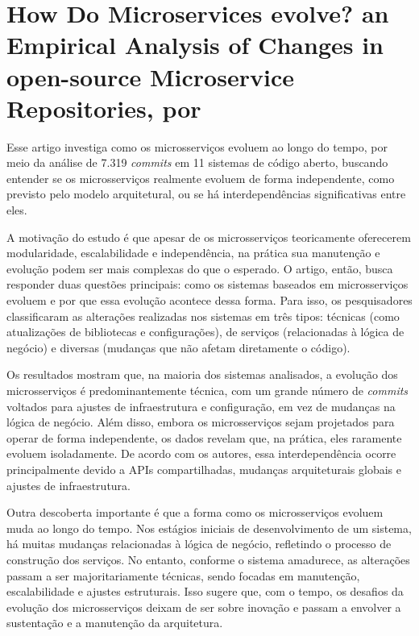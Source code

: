 \section{How Do Microservices evolve? an Empirical Analysis of Changes in open-source Microservice Repositories, por \texorpdfstring{}{Assunção et al. (2023)}}

Esse artigo investiga como os microsserviços evoluem ao longo do tempo, por meio da análise de 7.319 \emph{commits} em 11 sistemas de código aberto, buscando entender se os microsserviços realmente evoluem de forma independente, como previsto pelo modelo arquitetural, ou se há interdependências significativas entre eles.

A motivação do estudo é que apesar de os microsserviços teoricamente oferecerem modularidade, escalabilidade e independência, na prática sua manutenção e evolução podem ser mais complexas do que o esperado. O artigo, então, busca responder duas questões principais: como os sistemas baseados em microsserviços evoluem e por que essa evolução acontece dessa forma. Para isso, os pesquisadores classificaram as alterações realizadas nos sistemas em três tipos: técnicas (como atualizações de bibliotecas e configurações), de serviços (relacionadas à lógica de negócio) e diversas (mudanças que não afetam diretamente o código).

Os resultados mostram que, na maioria dos sistemas analisados, a evolução dos microsserviços é predominantemente técnica, com um grande número de \emph{commits} voltados para ajustes de infraestrutura e configuração, em vez de mudanças na lógica de negócio. Além disso, embora os microsserviços sejam projetados para operar de forma independente, os dados revelam que, na prática, eles raramente evoluem isoladamente. De acordo com os autores, essa interdependência ocorre principalmente devido a APIs compartilhadas, mudanças arquiteturais globais e ajustes de infraestrutura.

Outra descoberta importante é que a forma como os microsserviços evoluem muda ao longo do tempo. Nos estágios iniciais de desenvolvimento de um sistema, há muitas mudanças relacionadas à lógica de negócio, refletindo o processo de construção dos serviços. No entanto, conforme o sistema amadurece, as alterações passam a ser majoritariamente técnicas, sendo focadas em manutenção, escalabilidade e ajustes estruturais. Isso sugere que, com o tempo, os desafios da evolução dos microsserviços deixam de ser sobre inovação e passam a envolver a sustentação e a manutenção da arquitetura.

